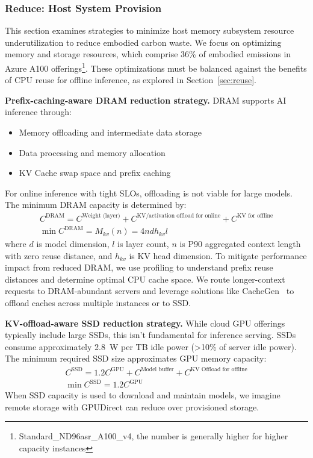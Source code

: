 \subsubsection{\textbf{Reduce: Host System Provision}} \label{sec:reduce}
This section examines strategies to minimize host memory subsystem resource underutilization to reduce embodied carbon waste. We focus on optimizing memory and storage resources, which comprise 36\% of embodied emissions in Azure A100 offerings\footnote{Standard\_ND96asr\_A100\_v4, the number is generally higher for higher capacity instances}. These optimizations must be balanced against the benefits of CPU reuse for offline inference, as explored in Section~\ref{sec:reuse}.


\textbf{Prefix-caching-aware DRAM reduction strategy. }
DRAM supports AI inference through:
\begin{itemize}
\item Memory offloading and intermediate data storage
\item Data processing and memory allocation
\item KV Cache swap space and prefix caching
\end{itemize}
For online inference with tight SLOs, offloading is not viable for large models. The minimum DRAM capacity is determined by:
\begin{equation}
\begin{gathered}
C^{\text{DRAM}} = C^{\text{Weight (layer)}} + C^{\text{KV/activation offload for online}} + C^{\text{KV for offline}} \\
\min C^{\text{DRAM}} = M_{k v}(n) = 4 n d h_{k v} l
\end{gathered}
\end{equation}
where $d$ is model dimension, $l$ is layer count, $n$ is P90 aggregated context length with zero reuse distance, and $h_{kv}$ is KV head dimension.
To mitigate performance impact from reduced DRAM, we use profiling to understand prefix reuse distances and determine optimal CPU cache space. We route longer-context requests to DRAM-abundant servers and leverage solutions like CacheGen~\cite{CacheGen} to offload caches across multiple instances or to SSD.


\textbf{KV-offload-aware SSD reduction strategy. }
While cloud GPU offerings typically include large SSDs, this isn't fundamental for inference serving. SSDs consume approximately 2.8~W per TB idle power (>10\% of server idle power). The minimum required SSD size approximates GPU memory capacity:
\begin{equation}
\begin{gathered}
C^{\text{SSD}} = 1.2 C^{\text{GPU}} + C^{\text{Model buffer}} + C^{\text{KV Offload for offline}} \\
\min C^{\text{SSD}} = 1.2 C^{\text{GPU}}
\end{gathered}
\end{equation}
When SSD capacity is used to download and maintain models, we imagine remote storage with GPUDirect can reduce over provisioned storage.

